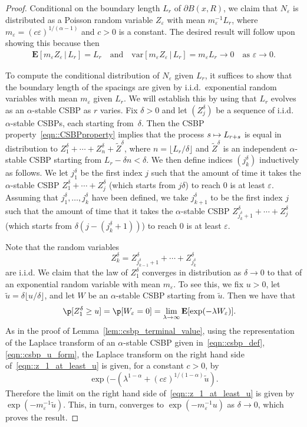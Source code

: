 \documentclass[JEP,XML,SOM,Unicode]{cedram}
\newcommand\mto{\mathchoice{\longmapsto}{\mapsto}{\mapsto}{\mapsto}}
\let\epsilon\varepsilon
\theoremstyle{plain}
\numberwithin{theorem}{section}
\theoremstyle{definition}
\newcommand \E {{\mathbf E}}
\newcommand{\var}{{\mathrm{var}}}
\let\wt\widetilde
\newcommand{\giv}{\,|\,}
\begin{document}
\begin{proof}
Conditional on the boundary length $L_r$ of $\partial B(x,R)$, we claim that $N_\epsilon$ is distributed as a Poisson random variable $Z_\epsilon$ with mean $m_\epsilon^{-1} L_r$, where $m_\epsilon = (c \epsilon)^{1/(\alpha-1)}$ and $c > 0$ is a constant. The desired result will follow upon showing this because then
\begin{align*}
	\E[ m_\epsilon Z_\epsilon \giv L_r] = L_r \quad\text{and}\quad
		\var[ m_\epsilon Z_\epsilon \giv L_r] = m_\epsilon L_r \to 0 \quad\text{as $\textstyle \epsilon \to 0$}.
\end{align*}

To compute the conditional distribution of $N_\epsilon$ given $L_r$, it suffices to show that the boundary length of the spacings are given by i.i.d.\ exponential random variables with mean $m_\epsilon$ given $L_r$. We will establish this by using that $L_r$ evolves as an $\alpha$-stable CSBP as $r$ varies. Fix $\delta > 0$ and let $(Z_j^\delta)$ be a sequence of i.i.d.\ $\alpha$-stable CSBPs, each starting from~$\delta$. Then the CSBP property~\eqref{eqn::CSBPproperty} implies that the process $s \mto L_{r+s}$ is equal in distribution to $Z_1^\delta + \cdots + Z_n^\delta + \wt{Z}^\delta$, where $n = \lfloor L_r/\delta \rfloor$ and $\wt{Z}^\delta$ is an independent $\alpha$-stable CSBP starting from $L_r - \delta n < \delta$. We then define indices $(j_k^\delta)$ inductively as follows. We let $j_1^\delta$ be the first index $j$ such that the amount of time it takes the $\alpha$-stable CSBP $Z_1^\delta + \cdots + Z_j^\delta$ (which starts from $j \delta$) to reach $0$ is at least $\epsilon$. Assuming that $j_1^\delta,\ldots,j_k^\delta$ have been defined, we take $j_{k+1}^\delta$ to be the first index $j$ such that the amount of time that it takes the $\alpha$-stable CSBP $Z_{j_k^\delta+1}^\delta + \cdots + Z_j^\delta$ (which starts from $\delta(j - (j_k^\delta+1))$) to reach $0$ is at least $\epsilon$.

Note that the random variables
\[
Z_k^\delta = Z_{j_{k-1}^\delta+1}^\delta + \cdots + Z_{j_k^\delta}^\delta
\]
are i.i.d. We claim that the law of $Z_1^\delta$ converges in distribution as $\delta \to 0$ to that of an exponential random variable with mean $m_\epsilon$. To see this, we fix $u > 0$, let $\wt{u} = \delta \lfloor u/\delta \rfloor$, and let $W$ be an $\alpha$-stable CSBP starting from $\wt{u}$. Then we have that
\begin{align}
\p[ Z_1^\delta \geq u]
&= \p[ W_\epsilon = 0]
= \lim_{\lambda \to \infty} \E[ \exp(-\lambda W_\epsilon)]. \label{eqn::z_1_at_least_u}
\end{align}
As in the proof of Lemma~\ref{lem::csbp_terminal_value}, using the representation of the Laplace transform of an $\alpha$-stable CSBP given in~\eqref{eqn::csbp_def}, \eqref{eqn::csbp_u_form}, the Laplace transform on the right hand side of~\eqref{eqn::z_1_at_least_u} is given, for a constant $c > 0$, by
\[
\exp( - (\lambda^{1-\alpha} + (c \epsilon)^{1/(1-\alpha)} \wt{u}).
\]
Therefore the limit on the right hand side of~\eqref{eqn::z_1_at_least_u} is given by $\exp(- m_\epsilon^{-1} \wt{u})$. This, in turn, converges to $\exp(-m_\epsilon^{-1} u)$ as $\delta \to 0$, which proves the result.
\end{proof}
\end{document}
